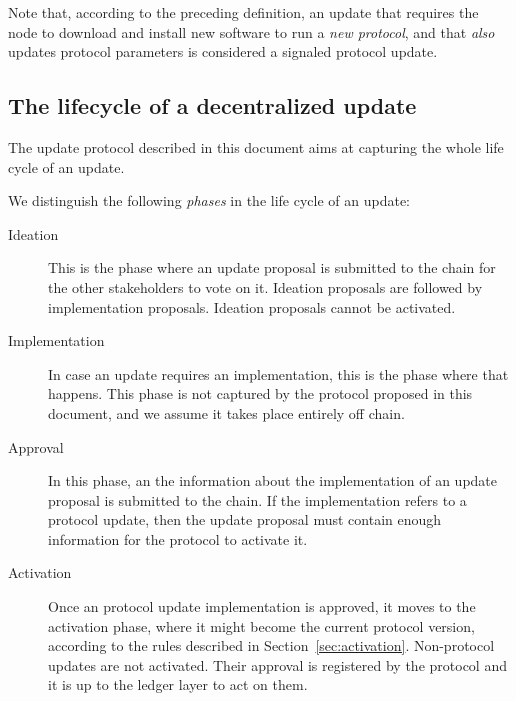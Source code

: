 \documentclass[11pt,a4paper]{article}
\begin{document}
Note that, according to the preceding definition, an update that requires the
node to download and install new software to run a \emph{new protocol}, and that
\emph{also} updates protocol parameters is considered a signaled protocol
update.


\subsection{The lifecycle of a decentralized update}
\label{sec:phases-an-update}

The update protocol described in this document aims at capturing the whole life
cycle of an update.
%

We distinguish the following \emph{phases} in the life cycle of an update:
\begin{description}
\item[Ideation] This is the phase where an update proposal is submitted to the
  chain for the other stakeholders to vote on it. Ideation proposals are
  followed by implementation proposals. Ideation proposals cannot be activated.
\item[Implementation] In case an update requires an implementation, this is the
  phase where that happens. This phase is not captured by the protocol proposed
  in this document, and we assume it takes place entirely off chain.
\item[Approval] In this phase, an the information about the implementation of an
  update proposal is submitted to the chain. If the implementation refers to a
  protocol update, then the update proposal must contain enough information for
  the protocol to activate it.
\item[Activation] Once an protocol update implementation is approved, it moves
  to the activation phase, where it might become the current protocol version,
  according to the rules described in Section~\ref{sec:activation}. Non-protocol
  updates are not activated. Their approval is registered by the protocol and
  it is up to the ledger layer to act on them.
\end{description}
\end{document}
